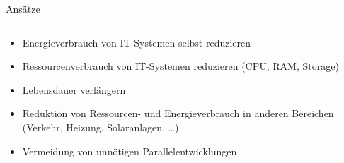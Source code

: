 \documentclass[t]{beamer}
\begin{document}
\begin{frame}{Ansätze}
    \begin{columns}
        \begin{column}{0.6\textwidth}
            \begin{itemize}
                \item Energieverbrauch von IT-Systemen selbst reduzieren
                \item Ressourcenverbrauch von IT-Systemen reduzieren
                    (CPU, RAM, Storage)
                \item Lebensdauer verlängern
                \item Reduktion von Ressourcen- und Energieverbrauch in
                    anderen Bereichen \\ (Verkehr, Heizung,
                    Solaranlagen, …)
                \item Vermeidung von unnötigen Parallelentwicklungen
            \end{itemize}
        \end{column}
        \begin{column}{0.4\textwidth}
        \end{column}
    \end{columns}
\end{frame}
\end{document}
